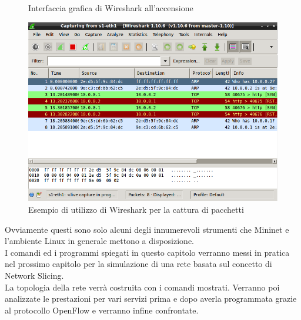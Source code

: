 \begin{itemize}
\begin{figure}[h!]
		\caption[Interfaccia di Wireshark]{Interfaccia grafica di Wireshark all'accensione}
		\label{fig:wireshark1}
	\end{figure}
	\begin{figure}[h!]
		\centering
		\includegraphics[width=0.9\linewidth]{../immagini/mn/wireshark}
		\caption[Utilizzo di Wireshark]{Esempio di utilizzo di Wireshark per la cattura di pacchetti}
		\label{fig:wireshark}
	\end{figure}
\end{itemize}
Ovviamente questi sono solo alcuni degli innumerevoli strumenti che Mininet e l'ambiente Linux in generale mettono a disposizione.\\
I comandi ed i programmi spiegati in questo capitolo verranno messi in pratica nel prossimo capitolo per la simulazione di una rete basata sul concetto di Network Slicing.\\
La topologia della rete verrà costruita con i comandi mostrati. Verranno poi analizzate le prestazioni per vari servizi prima e dopo averla programmata grazie al protocollo OpenFlow e verranno infine confrontate.